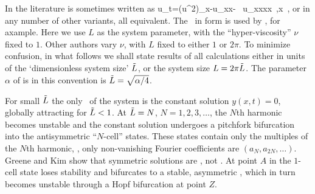 
In the literature  is sometimes written as
\beq
    u_t=(u^2)_x-u_{xx}- \nu \, u_{xxxx}
    \,,\qquad   x \in [0,L]
    \,,
or in any number of other variants, all equivalent.
The \KSe\ in  form  is used by
\cite{cross93,Mks86,ks04com}, for axample.
Here we use $L$ as the system parameter, with the 
``hyper-viscosity'' $\nu$ fixed to $1$.
Other authors vary  $\nu$, with $L$ fixed to either $1$ or $2\pi$.
To minimize confusion, in what follows we shall state results of all
calculations either in units of the `dimensionless system size' $\tilde{L}$,
or the system size $L = 2 \pi \tilde{L}$. The parameter $\alpha$
of  is in this convention is
$\tilde{L}=\sqrt{\alpha/4}$.


For small $\tilde{L}$ the only \eqv\ of the system is the
constant solution $y(x,t)=0$, globally attracting
for $\tilde{L}<1$. At $\tilde{L}=N$, $N=1,2,3, \dots$,
the $N$th harmonic becomes unstable and the constant solution
undergoes a pitchfork bifurcation into
the antisymmetric ``$N$-cell'' states.
These states contain only the multiples of the $N$th
harmonic, {\ie}, only non-vanishing Fourier coefficients
are $(a_N,a_{2N},\dots)$.
Greene and Kim show that symmetric solutions are \eqva, not \reqva.
At point $A$ in 
the $1$-cell state loses stability
and bifurcates to a stable,
asymmetric \reqv, which in turn becomes unstable
through a Hopf bifurcation at point $Z$.


